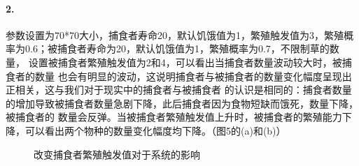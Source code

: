 \documentclass[a4paper]{ctexart}
\begin{document}
	\paragraph{2.}
	参数设置为70*70大小，捕食者寿命20，默认饥饿值为1，繁殖触发值为3，繁殖概率为0.6；被捕食者寿命为20，默认饥饿值为1，繁殖概率为0.7，不限制草的数量，
	设置被捕食者繁殖触发值为2和4，可以看出当捕食者数量波动较大时，被捕食者的数量
	也会有明显的波动，这说明捕食者与被捕食者的数量变化幅度呈现出正相关，这与我们对于现实中的捕食者与被捕食者
	的认识是相同的：捕食者数量的增加导致被捕食者数量急剧下降，此后捕食者因为食物短缺而饿死，数量下降，被捕食者的
	数量会反弹。当被捕食者繁殖触发值上升时，被捕食者的繁殖能力下降，可以看出两个物种的数量变化幅度均下降。（图5的(a)和(b)）
	\begin{figure}[htbp]
		\centering
		\caption{改变捕食者繁殖触发值对于系统的影响}
		\label{tigvalue}
	\end{figure}
\end{document}
